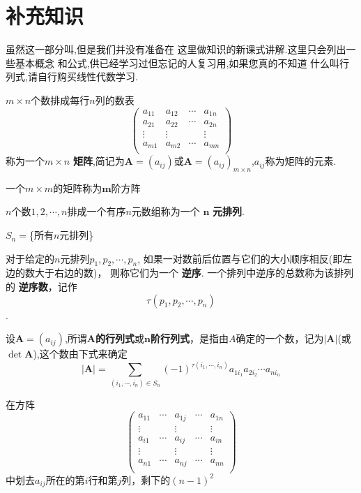 \section{补充知识}

虽然这一部分叫,但是我们并没有准备在
这里做知识的新课式讲解.这里只会列出一些基本概念
和公式,供已经学习过但忘记的人复习用,如果您真的不知道
什么叫行列式,请自行购买线性代数学习.

 $m\times n$个数排成每行$n$列的数表
$$\left(
  \begin{array}{cccc}
    a_{11} & a_{12} & \cdots & a_{1n} \\
    a_{21} & a_{22} & \cdots & a_{2n} \\
    \vdots & \vdots &  & \vdots \\
    a_{m1} & a_{m2} & \cdots & a_{mn} \\
  \end{array}
\right)$$
称为一个$m\times n$ \textbf{矩阵},简记为$\bm{A}=(a_{ij})$或$\bm{A}=(a_{ij})_{m\times n}$,$a_{ij}$称为矩阵的元素.

 一个$m\times m$的矩阵称为$\bm{m}$阶方阵

 $n$个数$1,2,\cdots,n$排成一个有序$n$元数组称为一个 $\bm{n}$ \textbf{元排列}.

 $S_n=$\{所有$n$元排列\}

 对于给定的$n$元排列$p_1,p_2,\cdots,p_n$,
如果一对数前后位置与它们的大小顺序相反(即左边的数大于右边的数)，
则称它们为一个 \textbf{逆序}.
一个排列中逆序的总数称为该排列的 \textbf{逆序数}，记作$$\tau(p_1,p_2,\cdots,p_n)$$.

 设$\bm{A}=(a_{ij})$,所谓$\bm{A}$\textbf{的行列式}或$\bm{n}$\textbf{阶行列式}，是指由$A$确定的一个数，记为$\left | \bm{A} \right |$(或$\det \bm{A}$),这个数由下式来确定
$$
\left | \bm{A} \right |=\sum_{(i_1,\cdots,i_n)\in S_n}{(-1)^{\tau(i_1,\cdots,i_n)}a_{1i_1}a_{2i_2}\cdots a_{ni_n}}
$$

 在方阵
$$
\left(
  \begin{array}{ccccc}
    a_{11} & \cdots & a_{1j} & \cdots & a_{1n} \\
    \vdots &  & \vdots &  & \vdots \\
    a_{i1} & \cdots & a_{ij} & \cdots & a_{in} \\
    \vdots &  & \vdots &  & \vdots \\
    a_{n1} & \cdots & a_{nj} & \cdots & a_{nn} \\
  \end{array}
\right)
$$
中划去$a_{ij}$所在的第$i$行和第$j$列，剩下的$(n-1)^{2}$

